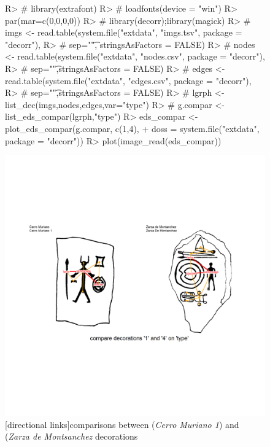\documentclass[article]{jss}
\begin{document}
\begin{figure}

\centering
\begin{Schunk}
\begin{Sinput}
R> # library(extrafont)
R> # loadfonts(device = "win")
R> par(mar=c(0,0,0,0))
R> # library(decorr);library(magick)
R> # imgs <- read.table(system.file("extdata", "imgs.tsv", package = "decorr"),
R> #                       sep="\t", stringsAsFactors = FALSE)
R> # nodes <- read.table(system.file("extdata", "nodes.csv", package = "decorr"),
R> #                     sep="\t",stringsAsFactors = FALSE)
R> # edges <- read.table(system.file("extdata", "edges.csv", package = "decorr"),
R> #                     sep="\t",stringsAsFactors = FALSE)
R> # lgrph <- list_dec(imgs,nodes,edges,var="type")
R> # g.compar <- list_eds_compar(lgrph,"type")
R> eds_compar <- plot_eds_compar(g.compar, c(1,4),
+                                doss = system.file("extdata", package = "decorr"))
R> plot(image_read(eds_compar))
\end{Sinput}
\end{Schunk}
\includegraphics{article_rvTH13-014}
[directional links]{comparisons between  (\emph{Cerro Muriano 1}) and  (\emph{Zarza de Montsanchez} decorations}
\end{figure}
\end{document}
